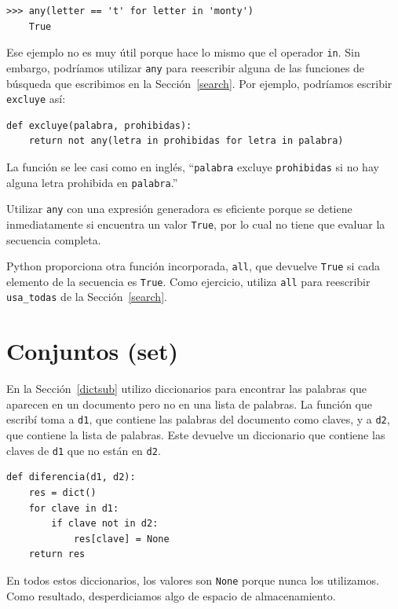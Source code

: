 \documentclass[10pt]{book}
\begin{document}
\begin{verbatim}
>>> any(letter == 't' for letter in 'monty')
    True
\end{verbatim}
%
Ese ejemplo no es muy útil porque hace lo mismo que
el operador {\tt in}.  Sin embargo, podríamos utilizar {\tt any} para reescribir
alguna de las funciones de búsqueda que escribimos en la Sección~\ref{search}.  Por
ejemplo, podríamos escribir {\tt excluye} así:

\begin{verbatim}
def excluye(palabra, prohibidas):
    return not any(letra in prohibidas for letra in palabra)
\end{verbatim}
%
La función se lee casi como en inglés, ``{\tt palabra} excluye
{\tt prohibidas} si no hay alguna letra prohibida en {\tt palabra}.''

Utilizar {\tt any} con una expresión generadora es eficiente porque
se detiene inmediatamente si encuentra un valor {\tt True},
por lo cual no tiene que evaluar la secuencia completa.

Python proporciona otra función incorporada, {\tt all}, que devuelve
{\tt True} si cada elemento de la secuencia es {\tt True}.  Como
ejercicio, utiliza {\tt all} para reescribir \verb"usa_todas" de la
Sección~\ref{search}.


\section{Conjuntos (set)}
\label{sets}

En la Sección~\ref{dictsub} utilizo diccionarios para encontrar las palabras
que aparecen en un documento pero no en una lista de palabras.  La función
que escribí toma a {\tt d1}, que contiene las palabras del documento
como claves, y a {\tt d2}, que contiene la lista de palabras.  Este
devuelve un diccionario que contiene las claves de {\tt d1} que
no están en {\tt d2}.

\begin{verbatim}
def diferencia(d1, d2):
    res = dict()
    for clave in d1:
        if clave not in d2:
            res[clave] = None
    return res
\end{verbatim}
%
En todos estos diccionarios, los valores son {\tt None} porque
nunca los utilizamos.  Como resultado, desperdiciamos algo de espacio de almacenamiento.
\end{document}
